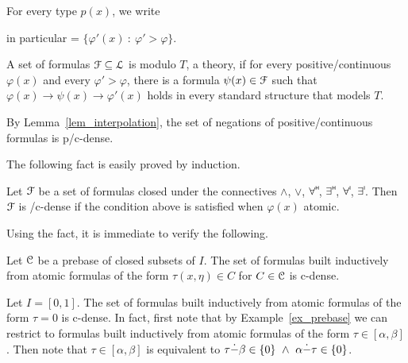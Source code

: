 \documentclass{amsproc}
\def\dotminus{\stackon[.2ex]{$-$}{$.$}}
\renewcommand*{\emph}[1]{%
   \smash{\tikz[baseline]\node[rectangle, fill=teal!25, rounded corners, inner xsep=0.5ex, inner ysep=0.2ex, anchor=base, minimum height = 2.7ex]{\strut #1};}}
\begin{document}
For every type $p(x)$, we write 

\ceq{\hfill \emph{$p'(x)$}}{=}{\big\{\varphi'(x)\ :\ \varphi'>\varphi\textrm{ for some }\varphi(x)\in p\big\}}

in particular \emph{$\{\varphi(x)\}'$} = $\big\{\varphi'(x)\ :\ \varphi'>\varphi\big\}$.

\begin{definition}\label{def_dense}
  A set of formulas ${\EuScript F}\subseteq{\EuScript L}$ is \emph{p/c-dense\/} modulo $T$, a theory, if for every positive/continuous $\varphi(x)$ and every $\varphi'>\varphi$, there is a formula $\psi(x)\in{\EuScript F}$ such that $\varphi(x)\rightarrow\psi(x)\rightarrow\varphi'(x)$ holds in every standard structure that models $T$.
\end{definition}

\begin{example}
  By Lemma~\ref{lem_interpolation}, the set of negations of positive/continuous formulas is p/c-dense.
\end{example}

The following fact is easily proved by induction.

\begin{fact}
  Let ${\EuScript F}$ be a set of formulas closed under the connectives $\wedge$, $\vee$, $\forall\raisebox{1.1ex}{\scaleto{\sf H}{.8ex}\kern-.2ex}$, $\exists\raisebox{1.1ex}{\scaleto{\sf H}{.8ex}\kern-.2ex}$, $\forall\raisebox{1.1ex}{\scaleto{\sf I}{.8ex}\kern-.2ex}$, $\exists\raisebox{1.1ex}{\scaleto{\sf I}{.8ex}\kern-.2ex}$.
  Then ${\EuScript F}$ is /c-dense if the condition above is satisfied when  $\varphi(x)$ atomic.
\end{fact}

Using the fact, it is immediate to verify the following.

\begin{example}\label{ex_prebase}
  Let ${\EuScript C}$ be a prebase of closed subsets of $I$.
  The set of formulas built inductively from atomic formulas of the form $\tau(x,\eta)\in C$ for $C\in{\EuScript C}$ is c-dense.
\end{example}

\begin{example}
  Let $I=[0,1]$.
  The set of formulas built inductively from atomic formulas of the form $\tau=0$ is c-dense.
  In fact, first note that by Example~\ref{ex_prebase} we can restrict to formulas built inductively from atomic formulas of the form $\tau\in[\alpha,\beta]$.
  Then note that $\tau\in[\alpha,\beta]$ is equivalent to $\tau\dotminus\beta\in\{0\}\ \wedge\ \alpha\dotminus\tau\in\{0\}$.
\end{example}
\end{document}
